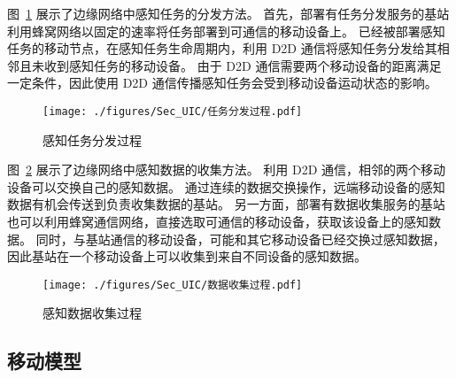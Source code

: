 图~\ref{Figure_PropagationProcedure} 展示了边缘网络中感知任务的分发方法。
首先，部署有任务分发服务的基站利用蜂窝网络以固定的速率将任务部署到可通信的移动设备上。
已经被部署感知任务的移动节点，在感知任务生命周期内，利用 D2D 通信将感知任务分发给其相邻且未收到感知任务的移动设备。
由于 D2D 通信需要两个移动设备的距离满足一定条件，因此使用 D2D 通信传播感知任务会受到移动设备运动状态的影响。

\begin{figure}[!h]
  \centering
  \texttt{[image: ./figures/Sec\_UIC/任务分发过程.pdf]}
  \vspace{-0.5em}
  \caption{感知任务分发过程}
  \vspace{-1em}
  \label{Figure_PropagationProcedure}
\end{figure}

图~\ref{Figure_FeedbacksCollection} 展示了边缘网络中感知数据的收集方法。
利用 D2D 通信，相邻的两个移动设备可以交换自己的感知数据。
通过连续的数据交换操作，远端移动设备的感知数据有机会传送到负责收集数据的基站。
另一方面，部署有数据收集服务的基站也可以利用蜂窝通信网络，直接选取可通信的移动设备，获取该设备上的感知数据。
同时，与基站通信的移动设备，可能和其它移动设备已经交换过感知数据，因此基站在一个移动设备上可以收集到来自不同设备的感知数据。


\begin{figure}[!h]
  \centering
  \texttt{[image: ./figures/Sec\_UIC/数据收集过程.pdf]}
  \vspace{-0.5em}
  \caption{感知数据收集过程}
  \vspace{-1.5em}
  \label{Figure_FeedbacksCollection}
\end{figure}

\subsection{移动模型}

